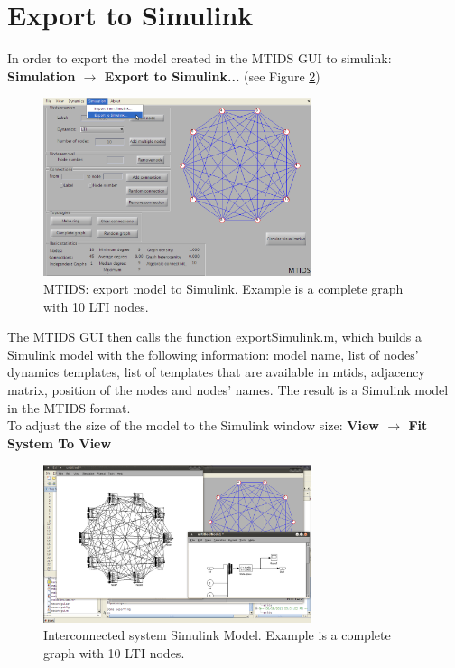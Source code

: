 \documentclass[a4paper,twoside, openright,12pt]{report}
\begin{document}
\section{Export to Simulink}\label{exportToSimulink}
In order to export the model created in the MTIDS GUI to simulink: \textbf{Simulation $\rightarrow$ Export to Simulink...} (see Figure \ref{exportFig})
\\
\begin{figure}[htb]
\centering
\includegraphics[width=0.7\textwidth]{pics/screenExport.eps}
\caption[MTIDS export to Simulink]{MTIDS: export model to Simulink. Example is a complete graph with 10 LTI nodes. }
\label{exportFig}
\end{figure}

The MTIDS GUI then calls the function exportSimulink.m, which builds a Simulink model with the following information:
model name, list of nodes' dynamics templates, list of templates that are available in mtids, adjacency matrix, position of the nodes and nodes' names. 
The result is a Simulink model in the MTIDS format. \\

To adjust the size of the model to the Simulink window size: \textbf{View $\rightarrow$ Fit System To View}\\
% 

\begin{figure}[htb]
\centering
\includegraphics[width=0.7\textwidth]{pics/screenExportResult.eps}
\caption[MTIDS exported Simulink model]{Interconnected system Simulink Model. Example is a complete graph with 10 LTI nodes. }
\label{exportFig}
\end{figure}
\end{document}
